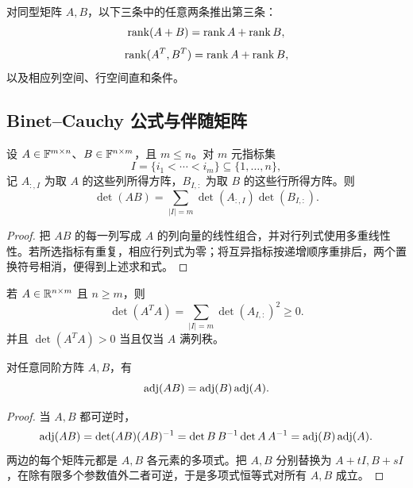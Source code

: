\begin{corollary}
对同型矩阵 $A,B$，以下三条中的任意两条推出第三条：
\begin{equation}
 \operatorname{rank}(A+B)=\operatorname{rank} A+\operatorname{rank} B,
\end{equation}
\begin{equation}
 \operatorname{rank}(A^T,B^T)=\operatorname{rank} A+\operatorname{rank} B,
\end{equation}
以及相应列空间、行空间直和条件。
\end{corollary}

\subsection{Binet--Cauchy 公式与伴随矩阵}

\begin{theorem}
设 $A\in\mathbb F^{m\times n}$、$B\in\mathbb F^{n\times m}$，且 $m\leq n$。对 $m$ 元指标集
\begin{equation}
 I=\{i_1<\cdots<i_m\}\subseteq\{1,\ldots,n\},
\end{equation}
记 $A_{:,I}$ 为取 $A$ 的这些列所得方阵，$B_{I,:}$ 为取 $B$ 的这些行所得方阵。则
\begin{equation}
 \det(AB)=\sum_{|I|=m}\det(A_{:,I})\det(B_{I,:}).
\end{equation}
\end{theorem}

\begin{proof}
把 $AB$ 的每一列写成 $A$ 的列向量的线性组合，并对行列式使用多重线性性。若所选指标有重复，相应行列式为零；将互异指标按递增顺序重排后，两个置换符号相消，便得到上述求和式。
\end{proof}

\begin{corollary}
若 $A\in\mathbb R^{n\times m}$ 且 $n\geq m$，则
\begin{equation}
 \det(A^TA)=\sum_{|I|=m}\det(A_{I,:})^2\geq0.
\end{equation}
并且 $\det(A^TA)>0$ 当且仅当 $A$ 满列秩。
\end{corollary}

\begin{proposition}
对任意同阶方阵 $A,B$，有
\begin{equation}
 \operatorname{adj}(AB)=\operatorname{adj}(B)\operatorname{adj}(A).
\end{equation}
\end{proposition}

\begin{proof}
当 $A,B$ 都可逆时，
\begin{equation}
 \operatorname{adj}(AB)=\det(AB)(AB)^{-1}
 =\det B\,B^{-1}\det A\,A^{-1}
 =\operatorname{adj}(B)\operatorname{adj}(A).
\end{equation}
两边的每个矩阵元都是 $A,B$ 各元素的多项式。把 $A,B$ 分别替换为 $A+tI,B+sI$，在除有限多个参数值外二者可逆，于是多项式恒等式对所有 $A,B$ 成立。
\end{proof}


